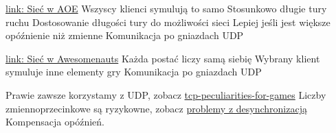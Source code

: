 \documentclass{beamer}
\begin{document}
\begin{frame}[fragile]
	\href{https://www.gamasutra.com/view/feature/131503/1500_archers_on_a_288_network_.php?print=1}{link: Sieć w AOE}
		\BI
		\I Wszyscy klienci symulują to samo
		\I Stosunkowo długie tury ruchu
		\I Dostosowanie długości tury do możliwości sieci
		\I Lepiej jeśli jest większe opóźnienie niż zmienne
		\EI
		Komunikacja po gniazdach UDP
	\EB
\end{frame}

\begin{frame}[fragile]
	\href{http://joostdevblog.blogspot.com/2014/09/core-network-structures-for-games.html}{link: Sieć w Awesomenauts}
		\BI
		\I Każda postać liczy samą siebię
		\I Wybrany klient symuluje inne elementy gry
		\EI
		Komunikacja po gniazdach UDP
	\EB
\end{frame}

\begin{frame}[fragile]
		\BI
		\I Prawie zawsze korzystamy z UDP, zobacz \href{http://ithare.com/tcp-peculiarities-for-games-part-1/}{tcp-peculiarities-for-games}
		\I Liczby zmiennoprzecinkowe są ryzykowne, zobacz \href{https://blog.forrestthewoods.com/synchronous-rts-engines-and-a-tale-of-desyncs-9d8c3e48b2be}{problemy z desynchronizacją}
		\I Kompensacja opóźnień.
		\EI
	\EB
\end{frame}



% 
\end{document}
